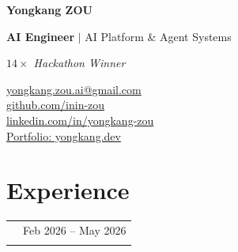 \documentclass[a4paper,10pt]{article}
\makeatletter
\newcommand{\BodyFont}{\fontsize{10.2}{12.8}\selectfont}
\newcommand{\DetailFont}{\fontsize{9.5}{11.5}\selectfont}
\newcommand{\entry}[3]{%
  \Needspace{7\baselineskip}%
  \begin{tabularx}{\linewidth}{
    @{}
    >{\raggedright\arraybackslash}X
    @{\hspace{12pt}}
    r
    @{}
  }
    {\fontsize{11}{13}\selectfont\bfseries #1}
      & {\DetailFont #2}\\[2pt]
    \multicolumn{2}{@{}p{\linewidth}@{}}{
      {\fontsize{10}{12}\selectfont\itshape #3}
    }\\
  \end{tabularx}\par\nobreak
}
\makeatother
\begin{document}
\BodyFont


\begin{minipage}[t]{0.60\textwidth}
  \vspace{0pt}

  {\fontsize{28}{31}\selectfont
    \bfseries Yongkang ZOU\par}

  \vspace{5pt}

  {\fontsize{10.5}{13}\selectfont
    \textbf{AI Engineer}
    $|$ AI Platform \& Agent Systems\par}

  \vspace{3pt}

  {\fontsize{10}{12}\selectfont
    \itshape $14\times$ Hackathon Winner\par}
\end{minipage}\hfill
\begin{minipage}[t]{0.38\textwidth}
  \vspace{0pt}

  \raggedleft
  \fontsize{9.5}{12.5}\selectfont

  \href{mailto:yongkang.zou.ai@gmail.com}
       {yongkang.zou.ai@gmail.com}\\
  \href{https://github.com/inin-zou}
       {github.com/inin-zou}\\
  \href{https://linkedin.com/in/yongkang-zou}
       {linkedin.com/in/yongkang-zou}\\
  \href{https://yongkang.dev}
       {Portfolio: yongkang.dev}
\end{minipage}

\par\vspace{3pt}


\section{Experience}

\entry
  {Epiminds (Stockholm, Sweden)}
  {Feb 2026 -- May 2026}
  {Founding AI Engineer $|$ Backed by EWOR}
\end{document}
